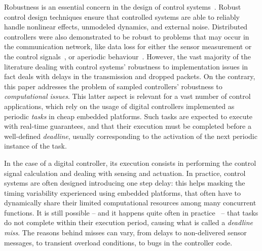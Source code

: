 Robustness is an essential concern in the design of control systems~\cite{Zhou:1998}.
Robust control design techniques ensure that controlled systems are able to reliably handle nonlinear effects, unmodeled dynamics, and external noise.
Distributed controllers were also demonstrated to be robust to problems that may occur in the communication network, like data loss for either the sensor measurement or the control signals~\cite{Lemmon:2002, Lemmon:2003b, Heemels:2015, Heemels:2016b, Heemels:2018}, or aperiodic behaviour~\cite{al2017stability}.
However, the vast majority of the literature dealing with control systems' robustness to implementation issues in fact deals with delays in the transmission and dropped packets.
On the contrary, this paper addresses the problem of sampled controllers' robustness to \emph{computational issues}.
This latter aspect is relevant for a vast number of control applications, which rely on the usage of digital controllers implemented as periodic \emph{tasks} in cheap embedded platforms.
Such tasks are expected to execute with real-time guarantees, and that their execution must be completed before a well-defined \emph{deadline}, usually corresponding to the activation of the next periodic instance of the task.

In the case of a digital controller, its execution consists in performing the control signal calculation and dealing with sensing and actuation.
In practice, control systems are often designed introducing one step delay: this helps masking the timing variability experienced using embedded platforms, that often have to dynamically share their limited computational resources among many concurrent functions.
It is still possible -- and it happens quite often in practice~\cite{akesson2020empirical} -- that tasks do not complete within their execution period, causing what is called a \emph{deadline miss}.
The reasons behind misses can vary, from delays to non-delivered sensor messages, to transient overload conditions, to bugs in the controller code.

